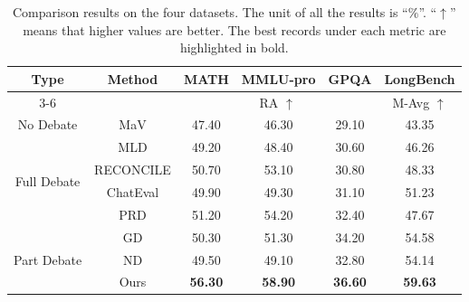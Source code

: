 \begin{table}
  \centering
  \setlength{\tabcolsep}{3mm}
  \begin{tabular}{c|c|ccc|c}
\toprule
\multirow{2}{*}{Type}    & \multirow{2}{*}{Method}                      & MATH                 & MMLU-pro             & GPQA                 & LongBench                \\ \cmidrule{3-6}
&               & \multicolumn{3}{c|}{RA $\uparrow$}    & M-Avg $\uparrow$  \\ \midrule
No Debate            & MaV       & 47.40          & 46.30          & 29.10          & 43.35          \\ \midrule
\multirow{4}{*}{Full Debate}   & MLD        & 49.20          & 48.40          & 30.60          & 46.26          \\
& RECONCILE         & 50.70          & 53.10          & 30.80          & 48.33          \\
& ChatEval          & 49.90          & 49.30          & 31.10          & 51.23          \\
& PRD               & 51.20          & 54.20          & 32.40          & 47.67          \\  \midrule
\multirow{3}{*}{Part Debate}                       &GD                      & 50.30          & 51.30          & 34.20          & 54.58          \\
& ND     & 49.50          & 49.10          & 32.80          & 54.14          \\  \cmidrule{2-6}
& Ours   & \textbf{56.30} & \textbf{58.90} & \textbf{36.60} & \textbf{59.63} \\ \bottomrule
\end{tabular}
  \caption{\label{table_add_exp}
   Comparison results on the four datasets. The unit of all the results is ``$\%$''. ``$\uparrow$'' means that higher values are better. The best records under each metric are highlighted in bold.
  }
\end{table}